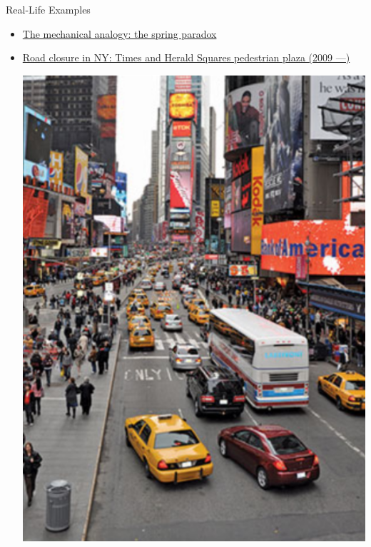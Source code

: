 \documentclass[10pt]{beamer}
\begin{document}
\begin{frame}{Real-Life Examples}
  \onslide<+->
  \begin{itemize}[<+->]
    \item \href{https://www.youtube.com/watch?v=Cg73j3QYRJc}{The mechanical analogy: the spring paradox}
    \item \href{https://engines.egr.uh.edu/episode/2814}{Road closure in NY: Times and Herald Squares pedestrian plaza (2009 ---)}
      \begin{center}
        \includegraphics[scale=.3]{fig/note02/nybefore.png}\hspace{3mm}

\end{center}
\end{itemize}
\end{frame}
\end{document}
